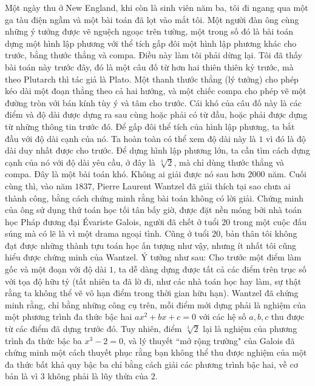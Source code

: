 \vspace*{235pt}

\begin{multicols}{2}	
	Một ngày thu ở New England, khi còn là sinh viên năm ba, tôi đi ngang qua một ga tàu điện ngầm và một bài toán đã lọt vào mắt tôi. Một người đàn ông cùng những ý tưởng được vẽ nguệch ngoạc trên tường, một trong số đó là bài toán dựng một hình lập phương với thể tích gấp đôi một hình lập phương khác cho trước, bằng thước thẳng và compa. 
	\vskip 0.1cm
	Điều này làm tôi phải dừng lại. Tôi đã thấy bài toán này trước đây, đó là một câu đố từ hơn hai thiên thiên kỷ trước, mà theo Plutarch thì tác giả là Plato. Một thanh thước thẳng (lý tưởng) cho phép kéo dài một đoạn thẳng theo cả hai hướng, và một chiếc compa cho phép vẽ một đường tròn với bán kính tùy ý và tâm cho trước. Cái khó của câu đố này là các điểm và độ dài được dựng ra sau cùng hoặc phải có từ đầu, hoặc phải được dựng từ những thông tin trước đó.
	\vskip 0.1cm
	Để gấp đôi thể tích của hình lập phương, ta bắt đầu với độ dài cạnh của nó. Ta hoàn toàn có thể xem độ dài này là $1$ vì đó là độ dài duy nhất được cho trước. Để dựng hình lập phương lớn, ta cần tìm cách dựng cạnh của nó với độ dài yêu cầu, ở đây là $\sqrt[3]{2}$, mà chỉ dùng thước thẳng và compa.
	\vskip 0.1cm
	Đây là một bài toán khó. Không ai giải được nó sau hơn $2000$ năm. Cuối cùng thì, vào năm $1837$, Pierre Laurent Wantzel đã giải thích tại sao chưa ai thành công, bằng cách chứng minh rằng bài toán không có lời giải. Chứng minh của ông sử dụng thứ toán học tối tân bấy giờ, được đặt nền móng bởi nhà toán học Pháp đương đại \'Evariste Galois, người đã chết ở tuổi $20$ trong một cuộc đấu súng mà có lẽ là vì một drama ngoại tình. Cũng ở tuổi $20$, bản thân tôi không đạt được những thành tựu toán học ấn tượng như vậy, nhưng ít nhất tôi cũng hiểu được chứng minh của Wantzel.
	\vskip 0.1cm
	Ý tưởng như sau: Cho trước một điểm làm gốc và một đoạn với độ dài $1$, ta dễ dàng dựng được tất cả các điểm trên trục số với tọa độ hữu tỷ (tất nhiên ta đã lờ đi, như các nhà toán học hay làm, sự thật rằng ta không thể vẽ vô hạn điểm trong thời gian hữu hạn).
	\vskip 0.1cm
	Wantzel đã chứng minh rằng, chỉ bằng những công cụ trên, mỗi điểm mới dựng phải là nghiệm của một phương trình đa thức bậc hai $ax^2 + bx + c = 0$ với các hệ số $a, b, c$ thu được từ các điểm đã dựng trước đó. Tuy nhiên, điểm $\sqrt[3]{2}$ lại là nghiệm của phương trình đa thức bậc ba $x^3 - 2 = 0$, và lý thuyết ``mở rộng trường" của Galois đã chứng minh một cách thuyết phục rằng bạn không thể thu được nghiệm của một đa thức bất khả quy bậc ba chỉ bằng cách giải các phương trình bậc hai, về cơ bản là vì $3$ không phải là lũy thừa của $2$.

\end{multicols}
